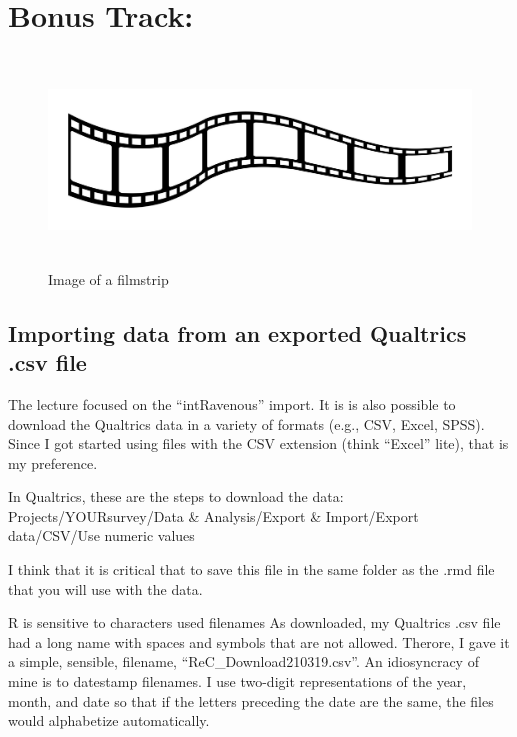 \documentclass[
  english,
]{book}
\begin{document}
\hypertarget{bonus-track}{%
\section{Bonus Track:}\label{bonus-track}}

\begin{figure}
\hypertarget{id}{%
\centering
\includegraphics[width=6.45833in,height=2.19792in]{images/film-strip-1.jpg}
\caption{Image of a filmstrip}\label{id}
}
\end{figure}

\hypertarget{importing-data-from-an-exported-qualtrics-.csv-file}{%
\subsection{Importing data from an exported Qualtrics .csv file}\label{importing-data-from-an-exported-qualtrics-.csv-file}}

The lecture focused on the ``intRavenous'' import. It is is also possible to download the Qualtrics data in a variety of formats (e.g., CSV, Excel, SPSS). Since I got started using files with the CSV extension (think ``Excel'' lite), that is my preference.

In Qualtrics, these are the steps to download the data: Projects/YOURsurvey/Data \& Analysis/Export \& Import/Export data/CSV/Use numeric values

I think that it is critical that to save this file in the same folder as the .rmd file that you will use with the data.

R is sensitive to characters used filenames As downloaded, my Qualtrics .csv file had a long name with spaces and symbols that are not allowed. Therore, I gave it a simple, sensible, filename, ``ReC\_Download210319.csv''. An idiosyncracy of mine is to datestamp filenames. I use two-digit representations of the year, month, and date so that if the letters preceding the date are the same, the files would alphabetize automatically.
\end{document}
